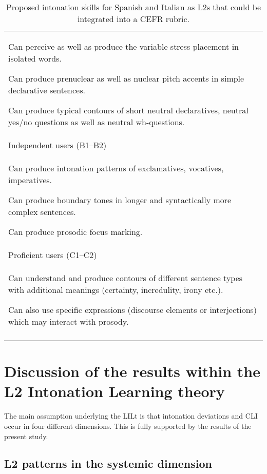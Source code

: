 \begin{table}
\begin{tabularx}{\textwidth}{X}
		\lsptoprule
		\multicolumn{1}{l}{{Basic users (A1--A2)}}\\\midrule
		 Can perceive as well as produce the variable stress placement in isolated words.
		 
		 Can produce prenuclear as well as nuclear pitch accents in simple declarative sentences.
		 
		 Can produce typical contours of short neutral declaratives, neutral yes/no questions as well as neutral wh-questions.\\
		\midrule
		\multicolumn{1}{l}{{Independent users (B1--B2)}}\\\midrule
		Can produce intonation patterns of exclamatives, vocatives, imperatives.
		
		Can produce boundary tones in longer and syntactically more complex sentences.
		
		Can produce prosodic focus marking.\\ 
		\midrule
		\multicolumn{1}{l}{{Proficient users (C1--C2)}}\\\midrule
		Can understand and produce contours of different sentence types with additional meanings (certainty, incredulity, irony etc.).
		
		Can also use specific expressions (discourse elements or interjections) which may interact with prosody.\\
		\lspbottomrule
	\end{tabularx}
\caption{\label{tab:5.1}Proposed intonation skills for Spanish and Italian as L2s that could be integrated into a CEFR rubric.}
\end{table}

\section{Discussion of the results within the L2 Intonation Learning theory}\label{sec:5.3} %

The main assumption underlying the LILt is that intonation deviations and CLI occur in four different dimensions. This is fully supported by the results of the present study.

\subsection{L2 patterns in the systemic dimension}\label{sec:5.3.1}

